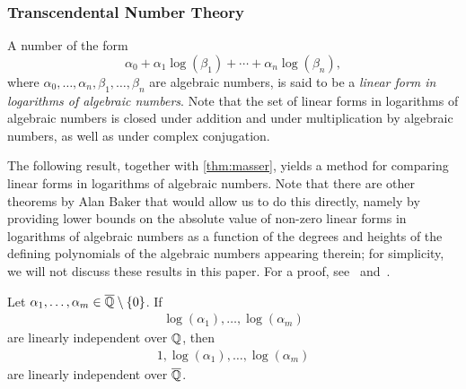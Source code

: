 \subsubsection{Transcendental Number Theory}


A number of the form
\begin{equation*}
  \alpha_{0} + \alpha_{1} \log(\beta_{1}) + \cdots + \alpha_{n} \log(\beta_{n}),
\end{equation*}
where $\alpha_{0}, \ldots, \alpha_{n}, \beta_{1}, \ldots, \beta_{n}$ are algebraic numbers, is said to be a \emph{linear form in logarithms of algebraic numbers}. Note that the set of linear forms in logarithms of algebraic numbers is closed under addition and under multiplication by algebraic numbers, as well as under complex conjugation.

The following result, together with \cref{thm:masser}, yields a method for comparing linear forms in logarithms of algebraic numbers. Note that there are other theorems by Alan Baker that would allow us to do this directly, namely by providing lower bounds on the absolute value of non-zero linear forms in logarithms of algebraic numbers as a function of the degrees and heights of the defining polynomials of the algebraic numbers appearing therein; for simplicity, we will not discuss
these results in this paper. For a proof, see~\cite{Baker75} and~\cite{BW93}.

\begin{theorem}[Baker]
\label{thm:Baker}
Let $\alpha_{1}, \ldots, \alpha_{m} \in \overline{\mathbb{Q}} \setminus \lbrace 0 \rbrace$. If
\begin{align*}
\log(\alpha_{1}), \ldots, \log(\alpha_{m})
\end{align*}
are linearly independent over $\mathbb{Q}$, then
\begin{align*}
1, \log(\alpha_{1}), \ldots, \log(\alpha_{m})
\end{align*}
are linearly independent over $\overline{\mathbb{Q}}$.
\end{theorem}



